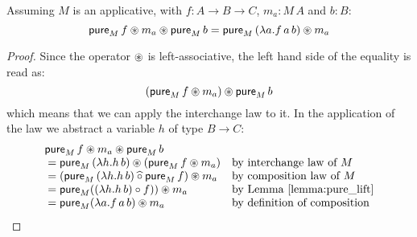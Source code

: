 
\begin{lemmaa}{9}
Assuming $M$ is an applicative, with $f : A \rightarrow B \rightarrow C$, $m_a : M\, A$ and $b : B$:
$$
\mathsf{pure}_M\, f \circledast m_a \circledast \mathsf{pure}_M\, b = \mathsf{pure}_M\, (\lambda a . f\, a\, b) \circledast m_a
$$
\end{lemmaa}
\begin{proof}
Since the operator $\circledast$ is left-associative, the left hand side of the equality is read as:
$$
(\mathsf{pure}_M\, f \circledast m_a) \circledast \mathsf{pure}_M\, b
$$
which means that we can apply the interchange law to it.
In the application of the law we abstract a variable $h$ of type $B\rightarrow C$:
$$
\begin{array}{ll}
\mathsf{pure}_M\, f \circledast m_a \circledast \mathsf{pure}_M\, b \\
{} =  \mathsf{pure}_M\, (\lambda h. h\, b) \circledast (\mathsf{pure}_M\, f \circledast m_a)
 & \mbox{by interchange law of }M\\
{} =  (\mathsf{pure}_M\, (\lambda h. h\, b) \mathbin{\widehat{\circ}} \mathsf{pure}_M\, f) \circledast m_a
 & \mbox{by composition law of }M\\
{} =  \mathsf{pure}_M ( (\lambda h. h\, b) \circ f ) ) \circledast m_a
 & \mbox{by Lemma \ref{lemma:pure_lift}}\\
{} =  \mathsf{pure}_M (\lambda a. f\, a\, b ) \circledast m_a
 & \mbox{by definition of composition}\\
\end{array}
$$
\end{proof}


